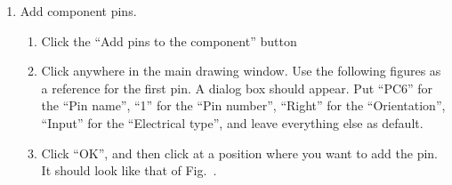 \documentclass[12pt,letterpaper]{scrartcl}
\begin{document}
\begin{enumerate}
	\item Add component pins. 
		\begin{enumerate}
			\item Click the ``Add pins to the component'' button 
			
			\item Click anywhere in the main drawing window. Use the following figures as a reference for the first pin. A dialog box should appear. Put ``PC6'' for the ``Pin name'', ``1'' for the ``Pin number'', ``Right'' for the ``Orientation'', ``Input'' for the ``Electrical type'', and leave everything else as default. 
			
			\item Click ``OK'', and then click at a position where you want to add the pin. It should look like that of Fig.~. 
		\end{enumerate}


\end{enumerate}
\end{document}
